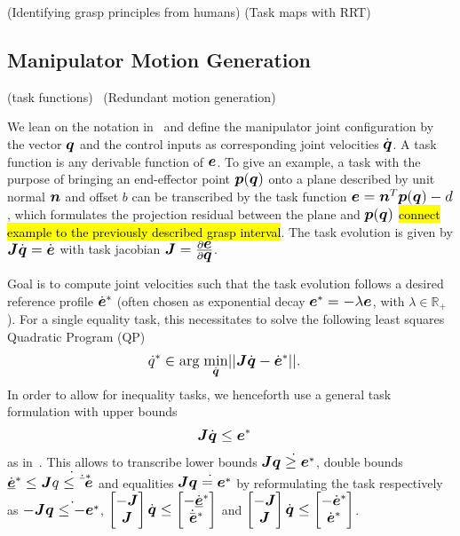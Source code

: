 \cite{Bala12}(Identifying grasp principles from humans) \cite{Gien08a, Gien08b, Vahr10}(Task maps with RRT)
%
\subsection{Manipulator Motion Generation}
\label{subsec:manip_motion}
%
 \cite{Sams91}(task functions)
~\cite{Sici91, Sent10}(Redundant motion generation)

We lean on the notation in~\cite{Esca14} and define the manipulator joint configuration by the
vector $\mbm{q}$ and the control inputs as corresponding joint velocities $\dot{\mbm{q}}$. A task
function is any derivable function of $\mbm{e}$. To give an example, a task with the purpose of
bringing an end-effector point $\mbm{p}(\mbm{q})$ onto a plane described by unit normal $\mbm{n}$
and offset $b$ can be transcribed by the task function $\mbm{e}=\mbm{n}^T\mbm{p}(\mbm{q})-d$, which
formulates the projection residual between the plane and $\mbm{p}(\mbm{q})$ \hl{connect example to
  the previously described grasp interval}. The task evolution is given by
$\mbm{J}\dot{\mbm{q}}=\dot{\mbm{e}}$ with task jacobian
$\mbm{J}=\frac{\partial\mbm{e}}{\partial\mbm{q}}$.

Goal is to compute joint velocities such that the task evolution follows a desired reference profile
$\dot{\mbm{e}}^*$ (often chosen as exponential decay $\mbm{e}^*= -\lambda \mbm{e}$, with $\lambda
\in \mathbb{R}_+$). For a single equality task, this necessitates to solve the following least
squares Quadratic Program (QP)
%
\begin{align}\label{eq:QP}
  \dot{q}^* &\in \mbox{arg} \; \underset{\footnotesize\dot{\mbm{q}}\normalsize}{\mbox{min}}||\mbm{J}\dot{\mbm{q}}-\dot{\mbm{e}}^*||.
\end{align}
%
In order to allow for inequality tasks, we henceforth use a general task formulation with upper
bounds 
\begin{align}\label{eq:task}
 \mbm{J}\dot{\mbm{q}}&\leq \mbm{e}^*
\end{align}
%
as in~\cite{Esca14}. This allows to transcribe lower bounds $\mbm{J}\dot{\mbm{q} \geq \mbm{e}^*}$,
double bounds $\dot{\underline{\mbm{e}}}^* \leq \mbm{J}\dot{\mbm{q} \leq \dot{\bar{\mbm{e}}}^*}$ and
equalities $\mbm{J}\dot{\mbm{q}=\mbm{e}^*}$ by reformulating the task respectively as
$-\mbm{J}\dot{\mbm{q} \leq -\mbm{e}^*}$, $\begin{bmatrix} -\mbm{J} \\
  \mbm{J} \end{bmatrix}\dot{\mbm{q}} \leq \begin{bmatrix} -\dot{\underline{\mbm{e}}}^*
  \\ \dot{\bar{\mbm{e}}}^* \end{bmatrix}$ and $\begin{bmatrix} -\mbm{J} \\
  \mbm{J} \end{bmatrix}\dot{\mbm{q}} \leq \begin{bmatrix} -\dot{\mbm{e}}^* \\
  \dot{\mbm{e}}^* \end{bmatrix}$.

